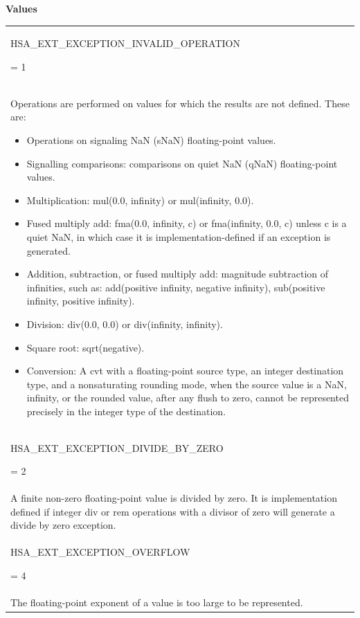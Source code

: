 \documentclass[final]{book}
\newcommand{\reftyp}[1]{#1}
\newcommand{\refenu}[1]{\reftyp{#1}}
\begin{document}
\noindent\textbf{Values}\\[-5mm]
\begin{longtable}{@{\hspace{2em}}p{\linewidth-2em}}
\hspace{-2em}\hypertarget{group__FinalizerCoreApi_1ggaac4b20de831dd17c83c1e2110bac0ef2af3acf5b85fdfd50083ba20eb4142bb9f}{\refenu{HSA_EXT_EXCEPTION_INVALID_OPERATION}} = 1\\Operations are performed on values for which the results are not defined. These are:
\begin{itemize}\item Operations on signaling NaN (sNaN) floating-point values.
\item Signalling comparisons: comparisons on quiet NaN (qNaN) floating-point values.
\item Multiplication: mul(0.0, infinity) or mul(infinity, 0.0).
\item Fused multiply add: fma(0.0, infinity, c) or fma(infinity, 0.0, c) unless c is a quiet NaN, in which case it is implementation-defined if an exception is generated.
\item Addition, subtraction, or fused multiply add: magnitude subtraction of infinities, such as: add(positive infinity, negative infinity), sub(positive infinity, positive infinity).
\item Division: div(0.0, 0.0) or div(infinity, infinity).
\item Square root: sqrt(negative).
\item Conversion: A cvt with a floating-point source type, an integer destination type, and a nonsaturating rounding mode, when the source value is a NaN, infinity, or the rounded value, after any flush to zero, cannot be represented precisely in the integer type of the destination. 
\end{itemize}\\[2mm]
\hspace{-2em}\hypertarget{group__FinalizerCoreApi_1ggaac4b20de831dd17c83c1e2110bac0ef2adf54889632462cdeb6bbf4f36d0f630c}{\refenu{HSA_EXT_EXCEPTION_DIVIDE_BY_ZERO}} = 2\\A finite non-zero floating-point value is divided by zero. It is implementation defined if integer div or rem operations with a divisor of zero will generate a divide by zero exception.\\[2mm]
\hspace{-2em}\hypertarget{group__FinalizerCoreApi_1ggaac4b20de831dd17c83c1e2110bac0ef2a3cffa261ec9fbb0910b0ed11ea17126e}{\refenu{HSA_EXT_EXCEPTION_OVERFLOW}} = 4\\The floating-point exponent of a value is too large to be represented.\\[2mm]

\end{longtable}
\end{document}
